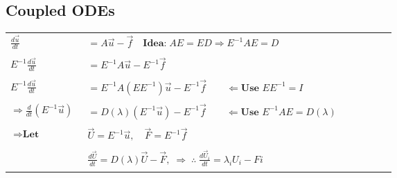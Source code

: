 \documentclass[8pt]{extarticle} %
\begin{document}
\begin{multicols*}{3}
  \subsection{Coupled ODEs}
  \begin{tabular}{L{0.2\linewidth} L{1\linewidth}}
  \tt $\frac{d\vec{u}}{dt}$ &  $= A\vec{u}-\vec{f}\quad\textbf{Idea:}\; AE=ED \Rightarrow E^{-1}AE=D$\\
  \\[-0.9em]
  \tt $E^{-1}\frac{d\vec{u}}{dt} $ &   $= E^{-1}A\vec{u}-E^{-1}\vec{f}$\\
  \\[-0.9em]
  \tt $E^{-1}\frac{d\vec{u}}{dt} $ &  $= E^{-1}A(EE^{-1})\vec{u}-E^{-1}\vec{f} \quad\quad\Leftarrow\textbf{Use }EE^{-1}=I$\\
  \\[-0.9em]
  \tt $\Rightarrow\frac{d}{dt}(E^{-1}\vec{u}) $ &  $= D(\lambda)(E^{-1}\vec{u})-E^{-1}\vec{f}  \quad\quad\Leftarrow\textbf{Use }E^{-1}AE=D(\lambda) $\\
  \\[-0.9em]
  \tt $\Rightarrow\textbf{Let}$ &  $\vec{U}=E^{-1}\vec{u},\quad\vec{F}=E^{-1}\vec{f}$ \\
  \\[-0.9em]
  \tt  &  $\frac{d\vec{U}}{dt} = D(\lambda)\vec{U}-\vec{F},\;\Rightarrow\;\therefore\;\frac{d\vec{U}_i}{dt}=\lambda_iU_i-Fi$\\
  \\[-0.9em]
  \end{tabular}
  \vspace{1ex}

\end{multicols*}
\end{document}
